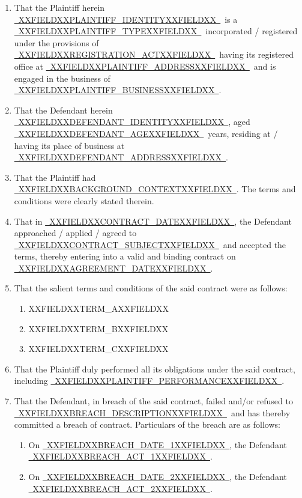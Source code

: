 \documentclass[12pt,a4paper]{article}
\newcommand{\fillline}[1]{\underline{~#1~}}
\begin{document}
\begin{enumerate}[leftmargin=*, label=\arabic{enumi}., itemsep=10pt, topsep=4pt]

  \item That the Plaintiff herein \fillline{XXFIELDXXPLAINTIFF_IDENTITYXXFIELDXX}\ is a
        \fillline{XXFIELDXXPLAINTIFF_TYPEXXFIELDXX}\ incorporated / registered under the provisions of
        \fillline{XXFIELDXXREGISTRATION_ACTXXFIELDXX}\ having its registered office at
        \fillline{XXFIELDXXPLAINTIFF_ADDRESSXXFIELDXX}\ and is engaged in the business of
        \fillline{XXFIELDXXPLAINTIFF_BUSINESSXXFIELDXX}.

  \item That the Defendant herein \fillline{XXFIELDXXDEFENDANT_IDENTITYXXFIELDXX}, aged
        \fillline{XXFIELDXXDEFENDANT_AGEXXFIELDXX}\ years, residing at / having its place of business at
        \fillline{XXFIELDXXDEFENDANT_ADDRESSXXFIELDXX}.

  \item That the Plaintiff had \fillline{XXFIELDXXBACKGROUND_CONTEXTXXFIELDXX}.
        The terms and conditions were clearly stated therein.

  \item That in \fillline{XXFIELDXXCONTRACT_DATEXXFIELDXX}, the Defendant approached / applied /
        agreed to \fillline{XXFIELDXXCONTRACT_SUBJECTXXFIELDXX}\ and accepted the terms,
        thereby entering into a valid and binding contract on \fillline{XXFIELDXXAGREEMENT_DATEXXFIELDXX}.

  \item That the salient terms and conditions of the said contract were as follows:
        \begin{enumerate}[label=(\alph*), itemsep=4pt]
          \item XXFIELDXXTERM_AXXFIELDXX
          \item XXFIELDXXTERM_BXXFIELDXX
          \item XXFIELDXXTERM_CXXFIELDXX
        \end{enumerate}

  \item That the Plaintiff duly performed all its obligations under the said contract,
        including \fillline{XXFIELDXXPLAINTIFF_PERFORMANCEXXFIELDXX}.

  \item That the Defendant, in breach of the said contract, failed and/or refused to
        \fillline{XXFIELDXXBREACH_DESCRIPTIONXXFIELDXX}\ and has thereby committed a breach of contract.
        Particulars of the breach are as follows:
        \begin{enumerate}[label=(\roman*), itemsep=4pt]
          \item On \fillline{XXFIELDXXBREACH_DATE_1XXFIELDXX}, the Defendant \fillline{XXFIELDXXBREACH_ACT_1XXFIELDXX}.
          \item On \fillline{XXFIELDXXBREACH_DATE_2XXFIELDXX}, the Defendant \fillline{XXFIELDXXBREACH_ACT_2XXFIELDXX}.
        \end{enumerate}


\end{enumerate}
\end{document}
